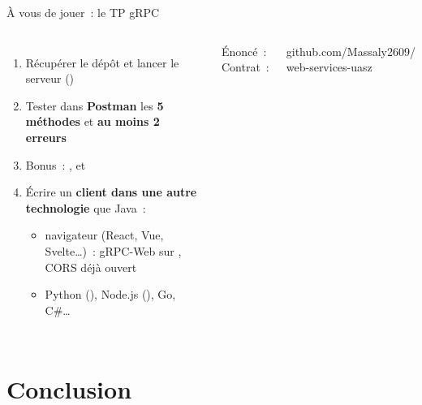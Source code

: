 \documentclass[aspectratio=169,11pt]{beamer}
\begin{document}
\begin{frame}{À vous de jouer~: le TP gRPC}
  \begin{columns}[c,onlytextwidth]
    \begin{enumerate}\small
      \item Récupérer le dépôt et lancer le serveur ()
      \item Tester dans \textbf{Postman} les \textbf{5 méthodes} et \textbf{au moins 2 erreurs}
      \item Bonus~: ,  et 
      \item Écrire un \textbf{client dans une autre technologie} que Java~:
      \begin{itemize}\scriptsize
        \item navigateur (React, Vue, Svelte…)~: gRPC-Web sur , CORS déjà ouvert
        \item Python (), Node.js (), Go, C\#…
      \end{itemize}
    \end{enumerate}
    \begin{carte}[gamber]\scriptsize\faBook\enspace Énoncé~: \\
    Contrat~: \end{carte}
    \centering
    \begin{tcolorbox}[gcard,width=3.6cm,halign=center]
      \par\vspace{3pt}
      {\tiny\ttfamily github.com/Massaly2609/\\web-services-uasz}
    \end{tcolorbox}
  \end{columns}
\end{frame}

\section{Conclusion}
\end{document}
